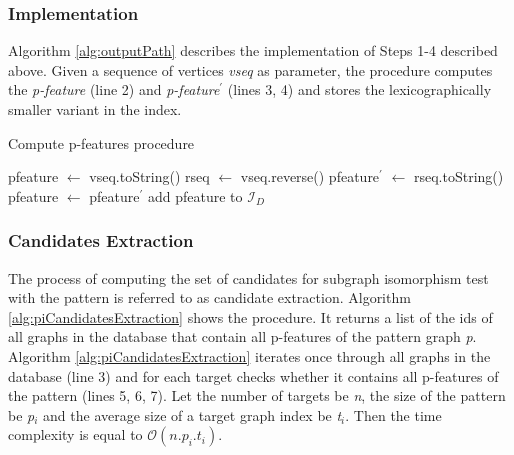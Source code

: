 \documentclass{l4proj}
\newcommand{\fancyI}{\mathcal{I}}
\begin{document}
\subsubsection{Implementation}
\label{pi:featuresImpl}
Algorithm \ref{alg:outputPath} describes the implementation of Steps 1-4 described above. Given a sequence of vertices \emph{vseq} as parameter, the procedure computes the \emph{p-feature} (line 2) and \emph{p-feature}$^{\prime}$ (lines 3, 4) and stores the lexicographically smaller variant in the index.

\begin{algorithm}
\centering
\caption{Compute p-features procedure}
\label{alg:outputPath}
\begin{algorithmic}[1]
\State pfeature $\gets$ vseq.toString() 
\State rseq $\gets$ vseq.reverse() 
\State pfeature$^{\prime}$ $\gets$ rseq.toString() 
\State pfeature $\gets$ pfeature$^{\prime}$ 
\EndIf
\If {pfeature not in $\fancyI_{D}$}
\State add pfeature to $\fancyI_{D}$
\EndIf
\EndProcedure
\end{algorithmic}
\end{algorithm}

\subsubsection{Candidates Extraction}
The process of computing the set of candidates for subgraph isomorphism test with the pattern is referred to as candidate extraction. Algorithm \ref{alg:piCandidatesExtraction} shows the procedure. It returns a list of the ids of all graphs in the database that contain all p-features of the pattern graph \emph{p}. Algorithm \ref{alg:piCandidatesExtraction} iterates once through all graphs in the database (line 3) and for each target checks whether it contains all p-features of the pattern (lines 5, 6, 7). Let the number of targets be \emph{n}, the size of the pattern be \emph{p$_{i}$} and the average size of a target graph index be \emph{t$_{i}$}. Then the time complexity is equal to $\mathcal{O}(n. p_{i}. t_{i})$.
\end{document}
